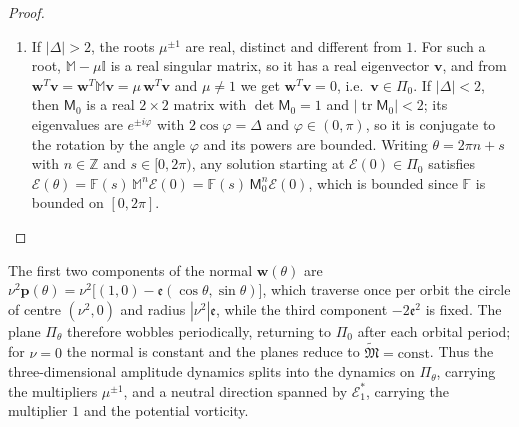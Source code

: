 \documentclass[reqno]{amsart}
\newcommand{\F}{\mathbb{F}}
\newcommand{\B}{{\mathfrak{M}}}
\newcommand{\ee}{\mathfrak{e}}
\newcommand{\tr}{\operatorname{tr}}     %
\begin{document}
\begin{proof}
\begin{enumerate}
\item[(iv)] If $|\Delta|>2$, the roots $\mu^{\pm1}$ are real, distinct and different from $1$. For such a root, $\mathbb M-\mu\mathbb I$ is a real singular matrix, so it has a real eigenvector $\mathbf v$, and from $\mathbf w^{T}\mathbf v=\mathbf w^{T}\mathbb M\mathbf v=\mu\,\mathbf w^{T}\mathbf v$ and $\mu\neq1$ we get $\mathbf w^{T}\mathbf v=0$, i.e.\ $\mathbf v\in\Pi_0$. If $|\Delta|<2$, then ${\mathsf M}_0$ is a real $2\times2$ matrix with $\det{\mathsf M}_0=1$ and $|\tr{\mathsf M}_0|<2$; its eigenvalues are $e^{\pm i\varphi}$ with $2\cos\varphi=\Delta$ and $\varphi\in(0,\pi)$, so it is conjugate to the rotation by the angle $\varphi$ and its powers are bounded. Writing $\theta=2\pi n+s$ with $n\in\mathbb Z$ and $s\in[0,2\pi)$, any solution starting at $\boldsymbol{\mathcal E}(0)\in\Pi_0$ satisfies $\boldsymbol{\mathcal E}(\theta)=\F(s)\,\mathbb M^n\boldsymbol{\mathcal E}(0)=\F(s)\,{\mathsf M}_0^n\boldsymbol{\mathcal E}(0)$, which is bounded since $\F$ is bounded on $[0,2\pi]$.
\end{enumerate}
\end{proof}
\noindent
The first two components of the normal $\mathbf w(\theta)$ are $\nu^2\mathbf p(\theta)=\nu^2\big[(1,0)-\ee(\cos\theta,\sin\theta)\big]$, which traverse once per orbit the circle of centre $(\nu^2,0)$ and radius $|\nu^2|\ee$, while the third component $-2\ee^2$ is fixed. The plane $\Pi_\theta$ therefore wobbles periodically, returning to $\Pi_0$ after each orbital period; for $\nu=0$ the normal is constant and the planes reduce to $\widetilde{\B}=\mathrm{const}$. Thus the three-dimensional amplitude dynamics splits into the dynamics on $\Pi_\theta$, carrying the multipliers $\mu^{\pm1}$, and a neutral direction spanned by $\boldsymbol{\mathcal E}^*_1$, carrying the multiplier $1$ and the potential vorticity.
\end{document}
